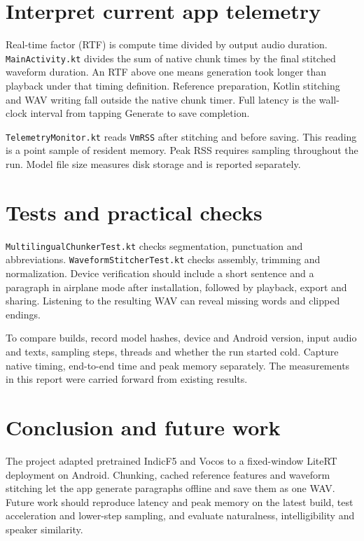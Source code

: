 \section{Interpret current app telemetry}

Real-time factor (RTF) is compute time divided by output audio duration.
\texttt{MainActivity.kt} divides the sum of native chunk times by the
final stitched waveform duration. An RTF above one means generation took
longer than playback under that timing definition. Reference preparation,
Kotlin stitching and WAV writing fall outside the native chunk timer.
Full latency is the wall-clock interval from tapping Generate to save
completion.

\texttt{TelemetryMonitor.kt} reads \texttt{VmRSS} after stitching and before
saving. This reading is a point sample of resident memory. Peak RSS
requires sampling throughout the run. Model file size measures disk storage
and is reported separately.

\section{Tests and practical checks}

\texttt{MultilingualChunkerTest.kt} checks segmentation, punctuation and
abbreviations. \texttt{WaveformStitcherTest.kt} checks assembly, trimming
and normalization. Device verification should include a short sentence
and a paragraph in airplane mode after installation, followed by playback,
export and sharing. Listening to the resulting WAV can reveal missing
words and clipped endings.

To compare builds, record model hashes, device and Android version, input
audio and texts, sampling steps, threads and whether the run started cold.
Capture native timing, end-to-end time and peak memory separately. The
measurements in this report were carried forward from existing results.

\section{Conclusion and future work}

The project adapted pretrained IndicF5 and Vocos to a fixed-window LiteRT
deployment on Android. Chunking, cached reference features and waveform
stitching let the app generate paragraphs offline and save them as one
WAV. Future work should reproduce latency and peak memory on the latest
build, test acceleration and lower-step sampling, and evaluate naturalness,
intelligibility and speaker similarity.
